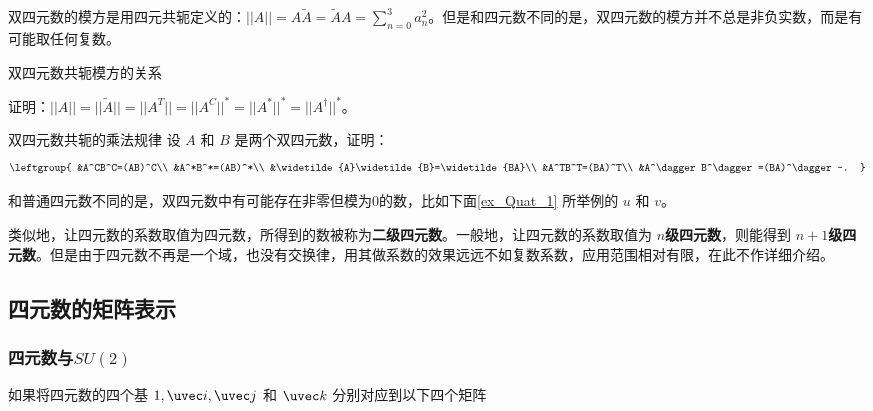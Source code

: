 双四元数的模方是用四元共轭定义的：$||A||=A\widetilde{A}=\widetilde{A}A=\sum^{3}_{n=0}a^2_n$。但是和四元数不同的是，双四元数的模方并不总是非负实数，而是有可能取任何复数。

\begin{exercise}{双四元数共轭模方的关系}

证明：$||A||=||\widetilde{A}||=||A^T||=||A^C||^*=||A^*||^*=||A^\dagger||^*$。

\end{exercise}

\begin{exercise}{双四元数共轭的乘法规律}
设 $A$ 和 $B$ 是两个双四元数，证明：
\begin{equation}
\leftgroup{
&A^CB^C=(AB)^C\\
&A^*B^*=(AB)^*\\
&\widetilde{A}\widetilde{B}=\widetilde{BA}\\
&A^TB^T=(BA)^T\\
&A^\dagger B^\dagger=(BA)^\dagger~.
}
\end{equation}

\end{exercise}

和普通四元数不同的是，双四元数中有可能存在非零但模为0的数，比如下面\autoref{ex_Quat_1} 所举例的 $u$ 和 $v$。

类似地，让四元数的系数取值为四元数，所得到的数被称为\textbf{二级四元数}。一般地，让四元数的系数取值为 $n$\textbf{级四元数}，则能得到 $n+1$\textbf{级四元数}。但是由于四元数不再是一个域，也没有交换律，用其做系数的效果远远不如复数系数，应用范围相对有限，在此不作详细介绍。


\subsection{四元数的矩阵表示}
\subsubsection{四元数与$SU(2)$}

如果将四元数的四个基 $1, \uvec i, \uvec j$ 和 $\uvec k$ 分别对应到以下四个矩阵


